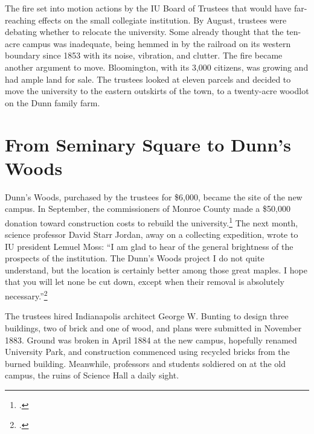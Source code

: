 \documentclass[
  american,
  letterpaper,
]{scrreprt}
\newcounter{none} %
\begin{document}
The fire set into motion actions by the IU Board of Trustees that would
have far-reaching effects on the small collegiate institution. By
August, trustees were debating whether to relocate the university. Some
already thought that the ten-acre campus was inadequate, being hemmed in
by the railroad on its western boundary since 1853 with its noise,
vibration, and clutter. The fire became another argument to move.
Bloomington, with its 3,000 citizens, was growing and had ample land for
sale. The trustees looked at eleven parcels and decided to move the
university to the eastern outskirts of the town, to a twenty-acre
woodlot on the Dunn family farm.

\section{From Seminary Square to Dunn's
Woods}\label{from-seminary-square-to-dunns-woods}

Dunn's Woods, purchased by the trustees for \$6,000, became the site of
the new campus. In September, the commissioners of Monroe County made a
\$50,000 donation toward construction costs to rebuild the
university.\footnote{.} The next month,
science professor David Starr Jordan, away on a collecting expedition,
wrote to IU president Lemuel Moss: ``I am glad to hear of the general
brightness of the prospects of the institution. The Dunn's Woods project
I do not quite understand, but the location is certainly better among
those great maples. I hope that you will let none be cut down, except
when their removal is absolutely necessary.''\footnote{.}

The trustees hired Indianapolis architect George W. Bunting to design
three buildings, two of brick and one of wood, and plans were submitted
in November 1883. Ground was broken in April 1884 at the new campus,
hopefully renamed University Park, and construction commenced using
recycled bricks from the burned building. Meanwhile, professors and
students soldiered on at the old campus, the ruins of Science Hall a
daily sight.
\end{document}
